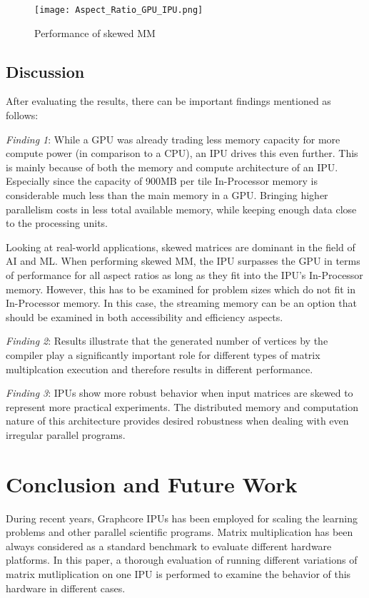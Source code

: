 \documentclass[a4paper,UKenglish,cleveref, autoref, thm-restate]{oasics-v2021}
\begin{document}
\begin{figure}[htbp]
	\centerline{\texttt{[image: Aspect\_Ratio\_GPU\_IPU.png]}}
	\caption{Performance of skewed MM}
	\label{fig: comp_new}
\end{figure}



\subsection{Discussion}

After evaluating the results, there can be important findings mentioned as follows:


\textit{Finding 1}: While a GPU was already trading less memory capacity for more compute power (in comparison to a CPU), an IPU drives this even further. This is mainly because of both the memory and compute architecture of an IPU. Especially since the capacity of 900MB per tile In-Processor memory is considerable much less than the main memory in a GPU. Bringing higher parallelism costs in less total available memory, while keeping enough data close to the processing units.

Looking at real-world applications, skewed matrices are dominant in the field of AI and ML. When performing skewed MM, the IPU surpasses the GPU in terms of performance for all aspect ratios as long as they fit into the IPU's In-Processor memory. However, this has to be examined for problem sizes which do not fit in In-Processor memory. In this case, the streaming memory can be an option that should be examined in both accessibility and efficiency aspects.

\textit{Finding 2}: Results illustrate that the generated number of vertices by the compiler play a significantly important role for different types of matrix multiplcation execution and therefore results in different performance.

\textit{Finding 3}: IPUs show more robust behavior when input matrices are skewed to represent more practical experiments. The distributed memory and computation nature of this architecture provides desired robustness when dealing with even irregular parallel programs.



\section{Conclusion and Future Work}
During recent years, Graphcore IPUs has been employed for scaling the learning problems and other parallel scientific programs. Matrix multiplication has been always considered as a standard benchmark to evaluate different hardware platforms. In this paper, a thorough evaluation of running different variations of matrix mutliplication on one IPU is performed to examine the behavior of this hardware in different cases. 
\end{document}
